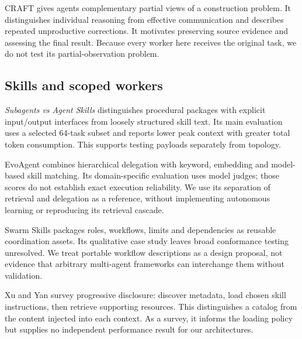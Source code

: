 CRAFT gives agents complementary partial views of a construction problem. It distinguishes individual reasoning from effective communication and describes repeated unproductive corrections. It motivates preserving source evidence and assessing the final result. Because every worker here receives the original task, we do not test its partial-observation problem.

\subsection{Skills and scoped workers}
\textit{Subagents vs Agent Skills} distinguishes procedural packages with explicit input/output interfaces from loosely structured skill text. Its main evaluation uses a selected 64-task subset and reports lower peak context with greater total token consumption. This supports testing payloads separately from topology.

EvoAgent combines hierarchical delegation with keyword, embedding and model-based skill matching. Its domain-specific evaluation uses model judges; those scores do not establish exact execution reliability. We use its separation of retrieval and delegation as a reference, without implementing autonomous learning or reproducing its retrieval cascade.

Swarm Skills packages roles, workflows, limits and dependencies as reusable coordination assets. Its qualitative case study leaves broad conformance testing unresolved. We treat portable workflow descriptions as a design proposal, not evidence that arbitrary multi-agent frameworks can interchange them without validation.

Xu and Yan survey progressive disclosure: discover metadata, load chosen skill instructions, then retrieve supporting resources. This distinguishes a catalog from the content injected into each context. As a survey, it informs the loading policy but supplies no independent performance result for our architectures.
